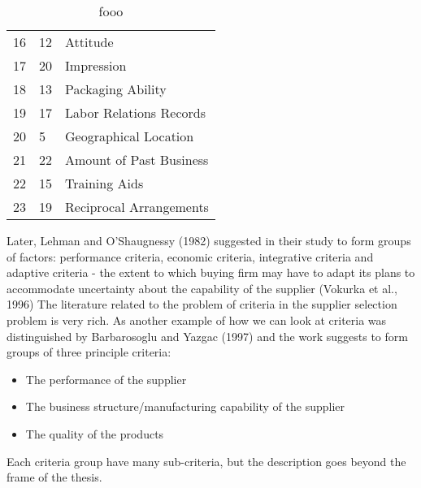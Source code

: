 \documentclass[oneside,12pt]{article}%
\begin{document}
\begin{table}[h]
{\begin{tabular}{lll}
    \multicolumn{1}{l|}{16}      & \multicolumn{1}{l|}{12}           & Attitude \\
    \multicolumn{1}{l|}{17}      & \multicolumn{1}{l|}{20}           & Impression \\
    \multicolumn{1}{l|}{18}      & \multicolumn{1}{l|}{13}           & Packaging Ability \\
    \multicolumn{1}{l|}{19}      & \multicolumn{1}{l|}{17}           & Labor Relations Records \\
    \multicolumn{1}{l|}{20}      & \multicolumn{1}{l|}{5}            & Geographical Location \\
    \multicolumn{1}{l|}{21}      & \multicolumn{1}{l|}{22}           & Amount of Past Business \\
    \multicolumn{1}{l|}{22}      & \multicolumn{1}{l|}{15}           & Training Aids \\
    \multicolumn{1}{l|}{23}      & \multicolumn{1}{l|}{19}           & Reciprocal Arrangements
  \end{tabular}
  }
  \caption{fooo}
\end{table}

Later, Lehman and O’Shaugnessy (1982) suggested in their study to form groups of factors: performance criteria, economic criteria, integrative criteria and adaptive criteria - the extent to which buying firm may have to adapt its plans to accommodate uncertainty about the capability of the supplier (Vokurka et al., 1996) The literature related to the problem of criteria in the supplier selection problem is very rich. As another example of how we can look at criteria was distinguished by Barbarosoglu and Yazgac (1997) and the work suggests to form groups of three principle criteria:

  \begin{itemize}
    \item The performance of the supplier
    \item The business structure/manufacturing capability of the supplier
    \item The quality of the products
  \end{itemize}

Each criteria group have many sub-criteria, but the description goes beyond the frame of the thesis.
\end{document}
